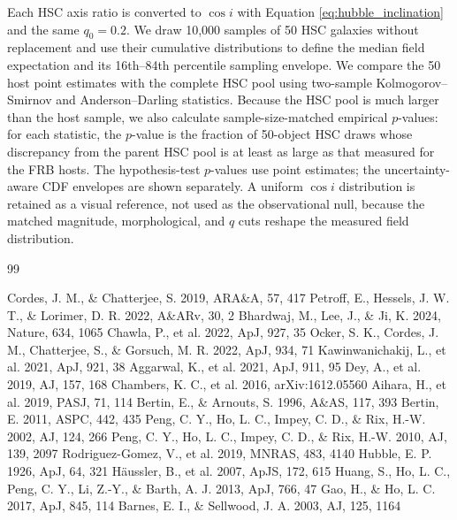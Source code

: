 \documentclass[10pt,twocolumn]{article}
\begin{document}
Each HSC axis ratio is converted to $\cos i$ with Equation
\ref{eq:hubble_inclination} and the same $q_0=0.2$.  We draw 10,000 samples of
50 HSC galaxies without replacement and use their cumulative distributions to
define the median field expectation and its 16th--84th percentile sampling
envelope.  We compare the 50 host point estimates with the complete HSC pool
using two-sample Kolmogorov--Smirnov and Anderson--Darling statistics.  Because
the HSC pool is much larger than the host sample, we also calculate
sample-size-matched empirical $p$-values: for each statistic, the $p$-value is
the fraction of 50-object HSC draws whose discrepancy from the parent HSC pool
is at least as large as that measured for the FRB hosts.  The hypothesis-test
$p$-values use point estimates; the uncertainty-aware CDF envelopes are shown
separately.  A uniform $\cos i$ distribution is retained as a visual reference,
not used as the observational null, because the matched magnitude,
morphological, and $q$ cuts reshape the measured field distribution.

\begin{thebibliography}{99}

Cordes, J. M., \& Chatterjee, S. 2019, ARA\&A, 57, 417
Petroff, E., Hessels, J. W. T., \& Lorimer, D. R. 2022, A\&ARv, 30, 2
Bhardwaj, M., Lee, J., \& Ji, K. 2024, Nature, 634, 1065
Chawla, P., et al. 2022, ApJ, 927, 35
Ocker, S. K., Cordes, J. M., Chatterjee, S., \& Gorsuch, M. R. 2022,
ApJ, 934, 71
Kawinwanichakij, L., et al. 2021, ApJ, 921, 38
Aggarwal, K., et al. 2021, ApJ, 911, 95
Dey, A., et al. 2019, AJ, 157, 168
Chambers, K. C., et al. 2016, arXiv:1612.05560
Aihara, H., et al. 2019, PASJ, 71, 114
Bertin, E., \& Arnouts, S. 1996, A\&AS, 117, 393
Bertin, E. 2011, ASPC, 442, 435
Peng, C. Y., Ho, L. C., Impey, C. D., \& Rix, H.-W. 2002, AJ, 124, 266
Peng, C. Y., Ho, L. C., Impey, C. D., \& Rix, H.-W. 2010, AJ, 139, 2097
Rodriguez-Gomez, V., et al. 2019, MNRAS, 483, 4140
Hubble, E. P. 1926, ApJ, 64, 321
H{\"a}ussler, B., et al. 2007, ApJS, 172, 615
Huang, S., Ho, L. C., Peng, C. Y., Li, Z.-Y., \& Barth, A. J. 2013,
ApJ, 766, 47
Gao, H., \& Ho, L. C. 2017, ApJ, 845, 114
Barnes, E. I., \& Sellwood, J. A. 2003, AJ, 125, 1164

\end{thebibliography}
\end{document}
